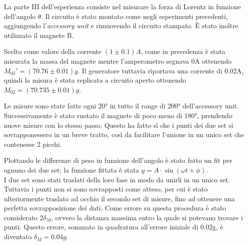 {\fontsize{12}{14}\selectfont 

La parte III dell'esperienza consiste nel misurare la forza di Lorentz in funzione dell'angolo $\theta$. Il circuito è stato montato come negli esperimenti precedenti, aggiungendo l'\emph{accessory unit} e rimuovendo il circuito stampato. È stato inoltre utilizzato il magnete B.
\par
Scelto come valore della corrente $(1 \pm 0.1) A$, come in precedenza è stata misurata la massa del magnete mentre l'amperometro segnava 0A ottenendo $M_{02}' = (70.76 \pm 0.01) g$. Il generatore tuttavia riportava una corrente di 0.02A, quindi la misura è stata replicata a circuito aperto ottenendo $M_{02} = (70.735 \pm 0.01) g$.
\par
Le misure sono state fatte ogni 20° in tutto il range di 200° dell'accessory unit. Successivamente è stato ruotato il magnete di poco meno di 180°, prendendo nuove misure con lo stesso passo. Questo ha fatto sì che i punti dei due set si sovrapponessero in un breve tratto, così da facilitare l'unione in un unico set che contenesse 2 picchi.
\par
Plottando le differenze di peso in funzione dell'angolo è stato fatto un fit per ognuno dei due set; la funzione fittata è stata $y = A\cdot \sin(\omega t + \phi)$.
\\
I due set sono stati traslati della loro fase in modo da unirli in un unico set. Tuttavia i punti non si sono sovrapposti come atteso, per cui è stato ulteriormente traslato ad occhio il secondo set di misure, fino ad ottenere una perfetta sovrapposizione dei dati. Come errore su questa procedura è stato considerato $2\delta_{M}$, ovvero la distanza massima entro la quale si potevano trovare i punti. Questo errore, sommato in quadratura all'errore iniziale di 0.02g, è diventato $\delta_M = 0.04g$.

\par}
